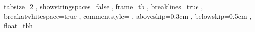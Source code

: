 \usepackage{nameref}

\usepackage{color}

\usepackage{listings}
\lstset
{
	tabsize=2
	, showstringspaces=false
	, frame=tb
	, breaklines=true
	, breakatwhitespace=true
	, commentstyle=\color{rltgreen}
	, aboveskip=0.3cm
	, belowskip=0.5cm
	, float=tbh
}

\renewcommand*{\lstlistlistingname}{List of Listings}

\newcommand{\code}[1]{\sffamily #1\normalfont}
\newcommand{\xml}[1]{\tt #1\normalfont}
\newcommand{\f}[2]{\frac{#1}{#2}}
\newcommand{\eq}[1]{\begin{equation}#1\end{equation}}
\newcommand{\pr}[1]{\left(#1\right)}
\newcommand{\der}[2]{\frac{d #1}{d #2}}
\newcommand{\pder}[2]{\frac{\partial #1}{\partial #2}}
\newcommand{\ngr}[1]{\textbf{#1}}


